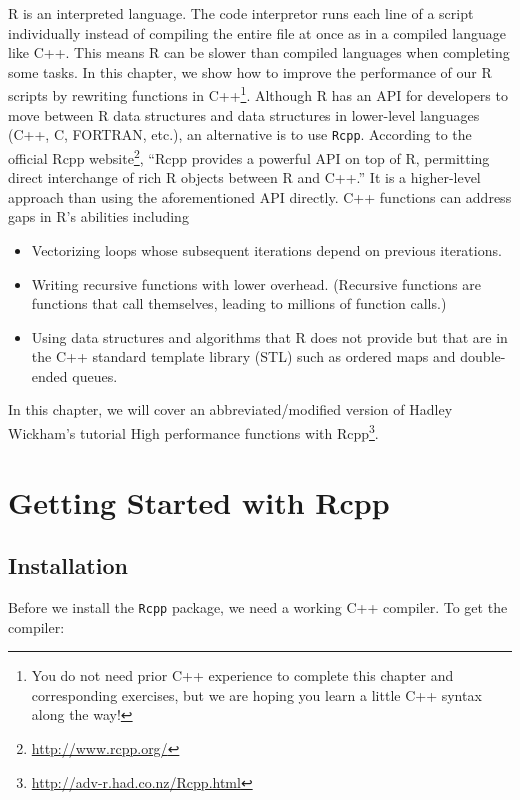 \documentclass[
]{krantz}
\providecommand{\tightlist}{%
  \setlength{\itemsep}{0pt}\setlength{\parskip}{0pt}}
\renewcommand{\href}[2]{#2\footnote{\url{#1}}}
\begin{document}
R is an interpreted language. The code interpretor runs each line of a script individually instead of compiling the entire file at once as in a compiled language like C++. This means R can be slower than compiled languages when completing some tasks. In this chapter, we show how to improve the performance of our R scripts by rewriting functions in C++\footnote{You do not need prior C++ experience to complete this chapter and corresponding exercises, but we are hoping you learn a little C++ syntax along the way!}. Although R has an API for developers to move between R data structures and data structures in lower-level languages (C++, C, FORTRAN, etc.), an alternative is to use \texttt{Rcpp}. According to the \href{http://www.rcpp.org/}{official Rcpp website}, ``Rcpp provides a powerful API on top of R, permitting direct interchange of rich R objects between R and C++.'' It is a higher-level approach than using the aforementioned API directly. C++ functions can address gaps in R's abilities including

\begin{itemize}
\tightlist
\item
  Vectorizing loops whose subsequent iterations depend on previous iterations.
\item
  Writing recursive functions with lower overhead. (Recursive functions are functions that call themselves, leading to millions of function calls.)
\item
  Using data structures and algorithms that R does not provide but that are in the C++ standard template library (STL) such as ordered maps and double-ended queues.
\end{itemize}

In this chapter, we will cover an abbreviated/modified version of Hadley Wickham's tutorial \href{http://adv-r.had.co.nz/Rcpp.html}{High performance functions with Rcpp}.

\hypertarget{getting-started-with-rcpp}{%
\section{Getting Started with Rcpp}\label{getting-started-with-rcpp}}

\hypertarget{installation}{%
\subsection{Installation}\label{installation}}

Before we install the \texttt{Rcpp} package, we need a working C++ compiler. To get the compiler:
\end{document}
